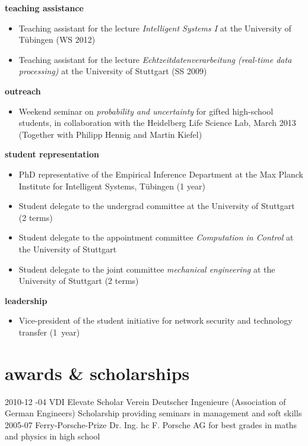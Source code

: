 \documentclass[a4paper]{k-cv} %
\begin{document}
{\Large \bfseries teaching assistance}
\begin{itemize}
 \item Teaching assistant for the lecture \emph{Intelligent Systems I} at the
University of T\"ubingen (WS 2012)
\item Teaching assistant for the lecture \emph{Echtzeitdatenverarbeitung
(real-time data processing)} at the University of Stuttgart (SS 2009)
\end{itemize}

{\Large \bfseries outreach}
\begin{itemize}
 \item Weekend seminar on \emph{probability and uncertainty} for gifted
high-school students, in collaboration with the Heidelberg Life Science Lab,
March 2013 (Together with Philipp Hennig and Martin Kiefel)
\end{itemize}

{\Large \bfseries student representation}
\begin{itemize}
 \item PhD representative of the Empirical Inference Department at the
Max Planck Institute for Intelligent Systems, T\"ubingen (1 year)
 \item Student delegate to the undergrad committee at the University of
Stuttgart (2 terms)
\item Student delegate to the appointment committee \emph{Computation in
Control} at the University of Stuttgart
\item Student delegate to the joint committee \emph{mechanical engineering} at
the University of Stuttgart (2 terms)
\end{itemize}

{\Large \bfseries leadership}
\begin{itemize}
 \item Vice-president of the student initiative for network security and
   technology transfer (1~year)
\end{itemize}

%
\section{awards \& scholarships}\normalfont

\begin{entrylist}
\entry
{2010-12 -04}
{VDI Elevate Scholar}
{Verein Deutscher Ingenieure (Association of German Engineers)}
{Scholarship providing seminars in management and soft skills}
\entry
{2005-07}
{Ferry-Porsche-Prize}
{Dr. Ing. hc F. Porsche AG}
{for best grades in maths and physics in high school}
\end{entrylist}
\end{document}
